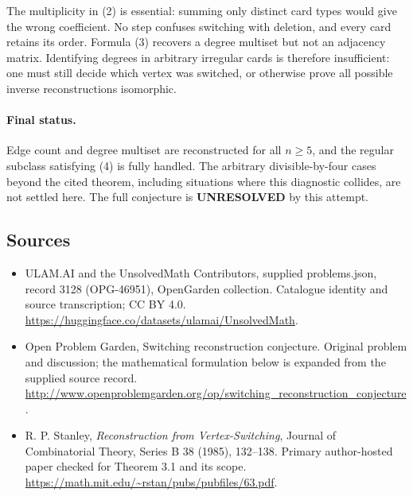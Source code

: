 \documentclass[11pt,a4paper]{article}
\begin{document}
The multiplicity in (2) is essential: summing only distinct card types would give the wrong coefficient. No step confuses switching with deletion, and every card retains its order. Formula (3) recovers a degree multiset but not an adjacency matrix. Identifying degrees in arbitrary irregular cards is therefore insufficient: one must still decide which vertex was switched, or otherwise prove all possible inverse reconstructions isomorphic.

\paragraph{Final status.}
Edge count and degree multiset are reconstructed for all $n\ge5$, and the regular subclass satisfying (4) is fully handled. The arbitrary divisible-by-four cases beyond the cited theorem, including situations where this diagnostic collides, are not settled here. The full conjecture is \textbf{UNRESOLVED} by this attempt.

\subsection{Sources}
\begin{itemize}
\item[S1] ULAM.AI and the UnsolvedMath Contributors, supplied problems.json, record 3128 (OPG-46951), OpenGarden collection. Catalogue identity and source transcription; CC BY 4.0.
\url{https://huggingface.co/datasets/ulamai/UnsolvedMath}.
\item[S2] Open Problem Garden, Switching reconstruction conjecture. Original problem and discussion; the mathematical formulation below is expanded from the supplied source record.
\url{http://www.openproblemgarden.org/op/switching_reconstruction_conjecture}.
\item[R1] R. P. Stanley, \emph{Reconstruction from Vertex-Switching}, Journal of Combinatorial Theory, Series B 38 (1985), 132--138. Primary author-hosted paper checked for Theorem 3.1 and its scope.
\url{https://math.mit.edu/~rstan/pubs/pubfiles/63.pdf}.
\end{itemize}
\end{document}
